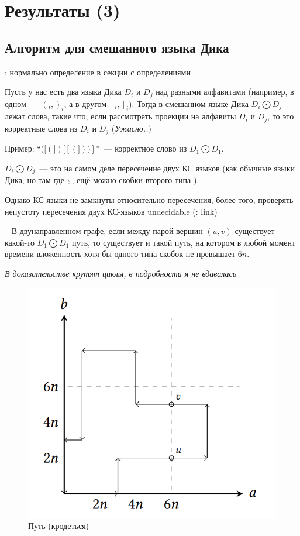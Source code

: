 \section{Результаты (3)}\label{section:dyck_1_1}

\subsection{Алгоритм для смешанного языка Дика}

\begin{definition}
    \TODO: нормально определение в секции с определениями

    Пусть у нас есть два языка Дика $D_i$ и $D_j$ над разными алфавитами (например, в одном~--- $(_i, )_i$, а в другом $[_i, ]_i$). Тогда в смешанном языке Дика $D_i \bigodot D_j$ лежат слова, такие что, если рассмотреть проекции на алфавиты $D_i$ и $D_j$, то это корректные слова из $D_i$ и $D_j$ (\textit{Ужасно..})

    Пример: ``$([(])[[(]))]$''~--- корректное слово из $D_1 \bigodot D_1$. 
\end{definition}

\begin{note}
    $D_i \bigodot D_j$~--- это на самом деле пересечение двух КС языков (как обычные языки Дика, но там где $\varepsilon$, ещё можно скобки второго типа \TODO).

    Однако КС-языки не замкнуты относительно пересечения, более того, проверять непустоту пересечения двух КС-языков undecidable (\TODO: link)
\end{note}

\begin{lemma}~\cite{Li21}
    В двунаправленном графе, если между парой вершин $(u, v)$ существует какой-то $D_1 \bigodot D_1$ путь, то существует и такой путь, на котором в любой момент времени вложенность хотя бы одного типа скобок не превышает $6n$.

    \textit{В доказательстве крутят циклы, в подробности я не вдавалась}
\end{lemma}

\begin{figure}[H]
    \includegraphics[width=0.75\linewidth]{img/6n_6n_path}
    \caption{Путь (кродеться)}
\end{figure}


